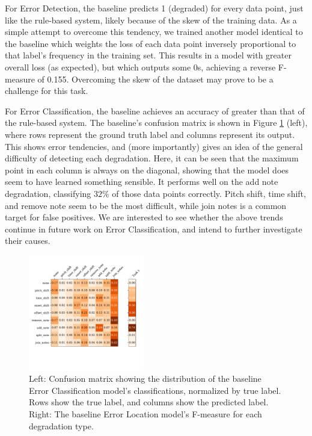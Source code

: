 \documentclass{article}
\begin{document}
For Error Detection, the baseline predicts 1 (degraded) for every data point, just like the rule-based system, likely because of the skew of the training data. As a simple attempt to overcome this tendency, we trained another model identical to the baseline which weights the loss of each data point inversely proportional to that label's frequency in the training set. This results in a model with greater overall loss (as expected), but which outputs some 0s, achieving a reverse F-measure of 0.155. Overcoming the skew of the dataset may prove to be a challenge for this task.

For Error Classification, the baseline achieves an accuracy of greater than that of the rule-based system. The baseline's confusion matrix is shown in Figure \ref{fig:confmat} (left), where rows represent the ground truth label and columns represent its output. This shows error tendencies, and (more importantly) gives an idea of the general difficulty of detecting each degradation. Here, it can be seen that the maximum point in each column is always on the diagonal, showing that the model does seem to have learned something sensible. It performs well on the add note degradation, classifying $32\%$ of those data points correctly. Pitch shift, time shift, and remove note seem to be the most difficult, while join notes is a common target for false positives. We are interested to see whether the above trends continue in future work on Error Classification, and intend to further investigate their causes.

\begin{figure}
    \centering
    \includegraphics[width=0.45\textwidth,trim={0.3cm 3.15cm 0.5cm 1.05cm},clip]{figs/task2confusionandtask3f.pdf}
    \caption{Left: Confusion matrix showing the distribution of the baseline Error Classification model's classifications, normalized by true label. Rows show the true label, and columns show the predicted label. Right: The baseline Error Location model's F-measure for each degradation type.}
    \label{fig:confmat}
\end{figure}
\end{document}
